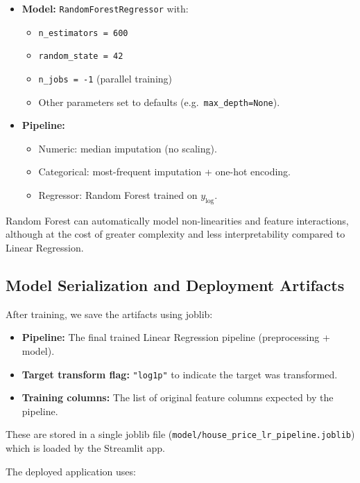 \documentclass[11pt,a4paper]{article}
\begin{document}
\begin{itemize}[leftmargin=*]
    \item \textbf{Model:} \texttt{RandomForestRegressor} with:
    \begin{itemize}
        \item \texttt{n\_estimators = 600}
        \item \texttt{random\_state = 42}
        \item \texttt{n\_jobs = -1} (parallel training)
        \item Other parameters set to defaults (e.g.\ \texttt{max\_depth=None}).
    \end{itemize}
    \item \textbf{Pipeline:}
    \begin{itemize}
        \item Numeric: median imputation (no scaling).
        \item Categorical: most-frequent imputation + one-hot encoding.
        \item Regressor: Random Forest trained on \(y_{\log}\).
    \end{itemize}
\end{itemize}

Random Forest can automatically model non-linearities and feature interactions, although at the cost of greater complexity and less interpretability compared to Linear Regression.

\subsection{Model Serialization and Deployment Artifacts}

After training, we save the artifacts using joblib:

\begin{itemize}[leftmargin=*]
    \item \textbf{Pipeline:} The final trained Linear Regression pipeline (preprocessing + model).
    \item \textbf{Target transform flag:} \texttt{"log1p"} to indicate the target was transformed.
    \item \textbf{Training columns:} The list of original feature columns expected by the pipeline.
\end{itemize}

These are stored in a single joblib file (\texttt{model/house\_price\_lr\_pipeline.joblib}) which is loaded by the Streamlit app.

The deployed application uses:
\end{document}
